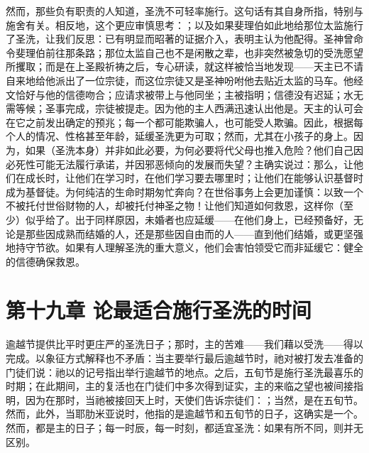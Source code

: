 然而，那些负有职责的人知道，圣洗不可轻率施行。这句话有其自身所指，特别与施舍有关。相反地，这个更应审慎思考：；以及如果斐理伯如此地给那位太监施行了圣洗，让我们反思：已有明显而昭著的证据介入，表明主认为他配得。圣神曾命令斐理伯前往那条路；那位太监自己也不是闲散之辈，也非突然被急切的受洗愿望所攫取；而是在上圣殿祈祷之后，专心研读，就这样被恰当地发现——天主已不请自来地给他派出了一位宗徒，而这位宗徒又是圣神吩咐他去贴近太监的马车。他经文恰好与他的信德吻合；应请求被带上与他同坐；主被指明；信德没有迟延；水无需等候；圣事完成，宗徒被提走。因为他的主人西满迅速认出他是。天主的认可会在它之前发出确定的预兆；每一个都可能欺骗人，也可能受人欺骗。因此，根据每个人的情况、性格甚至年龄，延缓圣洗更为可取；然而，尤其在小孩子的身上。因为，如果（圣洗本身）并非如此必要，为何必要将代父母也推入危险？他们自己因必死性可能无法履行承诺，并因邪恶倾向的发展而失望？主确实说过：那么，让他们在成长时，让他们在学习时，在他们学习要去哪里时；让他们在能够认识基督时成为基督徒。为何纯洁的生命时期匆忙奔向？在世俗事务上会更加谨慎：以致一个不被托付世俗财物的人，却被托付神圣之物！让他们知道如何救恩，这样你（至少）似乎给了。出于同样原因，未婚者也应延缓——在他们身上，已经预备好，无论是那些因成熟而结婚的人，还是那些因自由而的人——直到他们结婚，或更坚强地持守节欲。如果有人理解圣洗的重大意义，他们会害怕领受它而非延缓它：健全的信德确保救恩。\par


\section{第十九章 论最适合施行圣洗的时间}

逾越节提供比平时更庄严的圣洗日子；那时，主的苦难——我们藉以受洗——得以完成。以象征方式解释也不矛盾：当主要举行最后逾越节时，祂对被打发去准备的门徒们说：祂以的记号指出举行逾越节的地点。之后，五旬节是施行圣洗最喜乐的时期；在此期间，主的复活也在门徒们中多次得到证实，主的来临之望也被间接指明，因为在那时，当祂被接回天上时，天使们告诉宗徒们：；当然，是在五旬节。然而，此外，当耶肋米亚说时，他指的是逾越节和五旬节的日子，这确实是一个。然而，都是主的日子；每一时辰，每一时刻，都适宜圣洗：如果有所不同，则并无区别。\par


